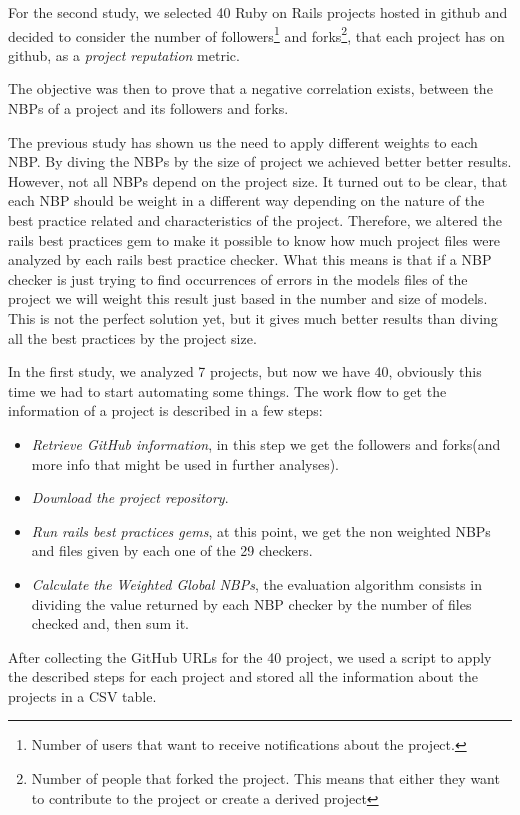 For the second study, we selected 40 Ruby on Rails projects hosted in github and
decided to consider the number of 
\textsf{followers}\footnote{Number of users that want to receive notifications about the project.} and
\textsf{forks}\footnote{Number of people that forked the project. This means that either they want to contribute to the project or create a derived project}, 
that each project has on github, 
as a \emph{project reputation} metric. 

The objective was then to prove that a negative correlation exists, between the NBPs of a project and its followers and forks. 

The previous study has shown us the need to apply different weights to each NBP. 
By diving the NBPs by the size of project we achieved better better results.
However, not all NBPs depend on the project size.
It turned out to be clear, that each NBP should be weight in a different way depending
on the nature of the best practice related and characteristics of the project.
Therefore, we altered the rails best practices gem to make it possible to know how much project files were analyzed 
by each rails best practice checker.
What this means is that if a NBP checker is just trying to find occurrences of errors in the models files of the project
we will weight this result just based in the number and size of models.
This is not the perfect solution yet, but it gives much better results than diving all the best practices by the project size.

In the first study, we analyzed 7 projects, but now we have 40, obviously this time we had to start automating some things.
The work flow to get the information of a project is described in a few steps:
\begin{itemize}
\item \emph{Retrieve GitHub information}, in this step we get the followers and forks(and more info that might be used in further analyses).
\item \emph{Download the project repository}.
\item \emph{Run rails best practices gems}, at this point, we get the non weighted NBPs and files given by each one of the 29 checkers.
\item \emph{Calculate the Weighted Global NBPs}, the evaluation algorithm consists in dividing the value returned by each NBP checker  by the number of files checked and, then sum it.
\end{itemize}

After collecting the GitHub URLs for the 40 project, we used a script to apply the described steps for each project
and stored all the information about the projects in a CSV table.


